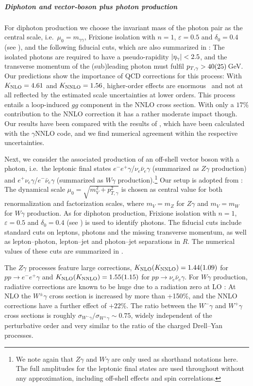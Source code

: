 \documentclass[english,11pt]{article}
\begin{document}
\subparagraph{Diphoton and vector-boson plus photon production}\quad

For diphoton production we choose the invariant mass of the photon pair 
as the central scale, i.e.\ $\mu_0=m_{\gamma\gamma}$, 
Frixione isolation with $n=1$, $\varepsilon = 0.5$ and $\delta_0=0.4$ (see ), and the following fiducial cuts, which are also summarized in : 
The isolated photons are required to have a pseudo-rapidity $|\eta_{\gamma}|<2.5$, 
and the transverse momentum of the (sub)leading photon must fulfil $p_{T,\gamma}>40(25)$\,GeV.
Our predictions show the importance of QCD corrections for this process: With $K_{\rm NLO} = 4.61$ and $K_{\rm NNLO} = 1.56$, higher-order 
effects are enormous~\cite{Catani:2011qz,Campbell:2016yrh} and not at all reflected by the estimated scale uncertainties at lower orders. 
This process entails a loop-induced $gg$ component in the NNLO cross section. 
With only a $17$\% contribution to the NNLO correction it has a rather moderate 
impact though. Our results have been compared with the results of , which have been calculated with the {$\gamma$NNLO} code, and we find numerical agreement within the respective uncertainties.

Next, we consider the associated production of an off-shell vector boson with a photon, 
i.e.\ the leptonic final states
$e^-e^+\gamma$/$\nu_e\bar\nu_e\gamma$ (summarized as $Z\gamma$ production) and 
$e^+\nu_e\gamma$/$e^-\bar\nu_e\gamma$ (summarized as $W\gamma$ production).\footnote{We note again that $Z\gamma$ and $W\gamma$ are only used as shorthand notations here. 
The full amplitudes for the leptonic final states are used throughout without any approximation, including off-shell effects and spin correlations.}
Our setup is adopted from :
The dynamical scale $\mu_0=\sqrt{m_V^2+p_{T,\gamma}^2}$ is chosen as central value for both 
renormalization and factorization scales, where $m_V=m_Z$ for $Z\gamma$ and $m_V=m_W$ for $W\gamma$ production. 
As for diphoton production, Frixione isolation with $n=1$, $\varepsilon = 0.5$ and $\delta_0=0.4$ (see ) is used to identify photons.
The fiducial cuts include standard cuts on leptons, photons and the missing transverse momentum, as well as lepton--photon, lepton--jet and photon--jet separations in $R$.
The numerical values of these cuts are summarized in .
%

%
The $Z\gamma$ processes feature large corrections, $K_{\rm NLO}(K_{\rm NNLO})=1.44(1.09)$ for $pp\to e^-e^+\gamma$ and 
$K_{\rm NLO}(K_{\rm NNLO})=1.55(1.15)$ for $pp\to \nu_e\bar\nu_e\gamma$. 
For $W\gamma$ production, radiative corrections are known to be huge due to a radiation zero at LO \cite{Mikaelian:1979nr}:
At NLO the $W^\pm\gamma$ cross section is increased by more than +150\%, and the NNLO corrections have a further effect of $+22$\%. 
The ratio between the $W^-\gamma$ and $W^+\gamma$ cross sections
is roughly $\sigma_{W^-\gamma}/\sigma_{W^+\gamma}\sim 0.75$, widely independent of the perturbative order and very similar to the ratio of the charged Drell--Yan processes. 
\end{document}
